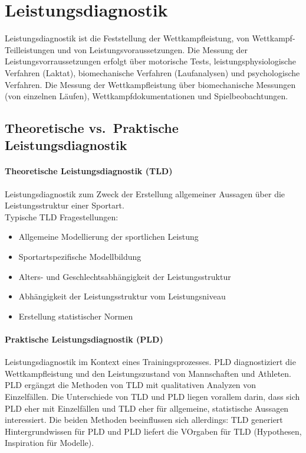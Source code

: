 \section{Leistungsdiagnostik}
Leistungsdiagnostik ist die Feststellung der Wettkampfleistung, von Wettkampf-Teilleistungen und von Leistungsvoraussetzungen.
Die Messung der Leistungsvorraussetzungen erfolgt über motorische Tests, leistungsphysiologische Verfahren (Laktat), biomechanische Verfahren (Laufanalysen) und psychologische Verfahren.
Die Messung der Wettkampfleistung über biomechanische Messungen (von einzelnen Läufen), Wettkampfdokumentationen und Spielbeobachtungen.

\subsection{Theoretische vs.\ Praktische Leistungsdiagnostik}
\paragraph{Theoretische Leistungsdiagnostik (TLD)}
Leistungsdiagnostik zum Zweck der Erstellung allgemeiner Aussagen über die Leistungsstruktur einer Sportart.\\
Typische TLD Fragestellungen:
\begin{itemize}
  \item Allgemeine Modellierung der sportlichen Leistung
  \item Sportartspezifische Modellbildung
  \item Alters- und Geschlechtsabhängigkeit der Leistungsstruktur
  \item Abhängigkeit der Leistungsstruktur vom Leistungsniveau
  \item Erstellung statistischer Normen
\end{itemize}
\paragraph{Praktische Leistungsdiagnostik (PLD)}
Leistungsdiagnostik im Kontext eines Trainingsprozesses.
PLD diagnostiziert die Wettkampfleistung und den Leistungszustand von Mannschaften und Athleten.
PLD ergängzt die Methoden von TLD mit qualitativen Analyzen von Einzelfällen.
Die Unterschiede von TLD und PLD liegen vorallem darin, dass sich PLD eher mit Einzelfällen und TLD eher für allgemeine, statistische Aussagen interessiert.
Die beiden Methoden beeinflussen sich allerdings: TLD generiert Hintergrundwissen für PLD und PLD liefert die VOrgaben für TLD (Hypothesen, Inspiration für Modelle).
